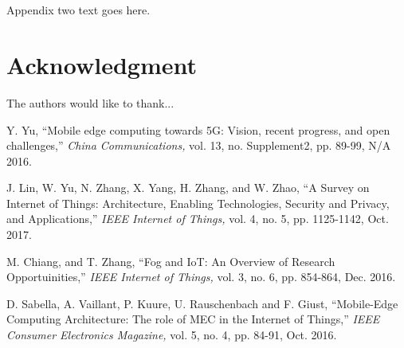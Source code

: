 \documentclass[conference,compsoc]{IEEEtran}
\theoremstyle{definition}
\begin{document}
\section{}
Appendix two text goes here.


\section*{Acknowledgment}


The authors would like to thank...


\ifCLASSOPTIONcaptionsoff
  \newpage
\fi





%
%
%
\begin{thebibliography}{1}

Y. Yu, ``Mobile edge computing towards 5G: Vision, recent progress, and open challenges,'' \emph{China Communications,} vol. 13, no. Supplement2, pp. 89-99, N/A 2016.

 J. Lin, W. Yu, N. Zhang, X. Yang, H. Zhang, and W. Zhao,
 ``A Survey on Internet of Things: Architecture, Enabling Technologies,
 Security and Privacy, and Applications,''
 \emph{IEEE Internet of Things,} vol. 4, no. 5, pp. 1125-1142, Oct. 2017. %

 M. Chiang, and T. Zhang, ``Fog and IoT: An Overview of Research Opportuinities,'' \emph{IEEE Internet of Things,} vol. 3, no. 6, pp. 854-864, Dec. 2016.%

D. Sabella, A. Vaillant, P. Kuure, U. Rauschenbach and F. Giust, ``Mobile-Edge Computing Architecture: The role of MEC in the Internet of Things,'' \emph{IEEE Consumer Electronics Magazine,} vol. 5, no. 4, pp. 84-91, Oct. 2016.


\end{thebibliography}
\end{document}
